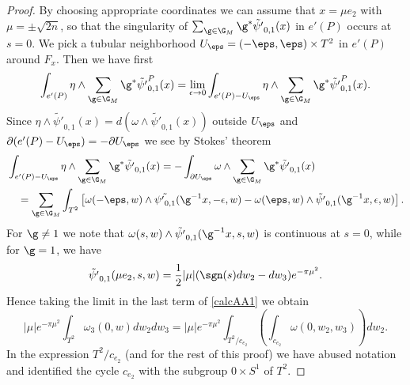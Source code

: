 \begin{proof}
By choosing appropriate coordinates we can assume that $x = \mu e_2$ with $\mu = \pm \sqrt{2n}$, so that the singularity of $\sum_{ \g \in \G_M} \g^{\ast} \tilde{\psi'}_{0,1}(x)$ in $e'(P)$ occurs at $s=0$. 
We pick a tubular neighborhood $U_\eps= (-\eps,\eps) \times T^2$ in $e'(P)$ around $F_x$. Then we have first
\begin{equation*}
\int_{e'(P)} \eta \wedge \sum_{ \g \in \G_M} \g^{\ast} \tilde{\psi'}_{0,1}^P(x)= 
 \lim_{\epsilon \to 0} \int_{e'(P) - U_{\eps}} \eta \wedge  \sum_{ \g \in \G_M} \g^{\ast}\tilde{\psi'}_{0,1}^P(x).
\end{equation*}
Since $\eta \wedge \tilde{\psi'}_{0,1}(x) = d(\omega \wedge \tilde{\psi'}_{0,1}(x))$ outside $U_{\eps}$ and $\partial (e'(P) - U_{\eps}) =
- \partial U_{\eps}$  we see by Stokes' theorem
\begin{align}\label{calcAA1}
&\int_{e'(P) - U_{\eps}} \eta \wedge \sum_{ \g \in \G_M} \g^{\ast} \tilde{\psi'}_{0,1}(x)
= - \int_{\partial U_{\eps}} \omega \wedge  \sum_{ \g \in \G_M} \g^{\ast}\tilde{\psi'}_{0,1}(x) \\
& \quad = \sum_{ \g \in \G_M} \int_{T^2} \left[\omega(-\eps,w) \wedge \tilde{{\psi'}_{0,1}}(\g^{-1}x,-\epsilon,w) - 
\omega(\eps,w) \wedge \tilde{\psi'}_{0,1}(\g^{-1} x,\epsilon,w) \right]. \notag
\end{align}
For $\g \ne 1$ we note that $\omega(s,w) \wedge \tilde{\psi'}_{0,1}(\g^{-1}x,s,w)$ is continuous at $s=0$, while for $\g=1$, we have
\begin{equation}\label{psi'formula}
 \tilde{\psi'}_{0,1}(\mu e_2,s,w) = \frac12|\mu| (\sgn(s)dw_2-dw_3) e^{- \pi \mu^2}.
 \end{equation}
Hence taking the limit in the last term of \eqref{calcAA1} we obtain 
\begin{equation*}
|\mu| e^{- \pi \mu^2}\int_{T^2} \omega_3(0,w) dw_2dw_3 = |\mu| e^{- \pi \mu^2}\int_{T^2/ c_{e_2}} \left( \int_{c_{e_2}} \omega(0,w_2,w_3) \right) dw_2.
\end{equation*}
 In the expression $T^2/ c_{e_2}$ (and for the rest of this proof) we have abused notation and identified the cycle $c_{e_2}$ with the subgroup $0 \times S^1$ of $T^2$.


\end{proof}
